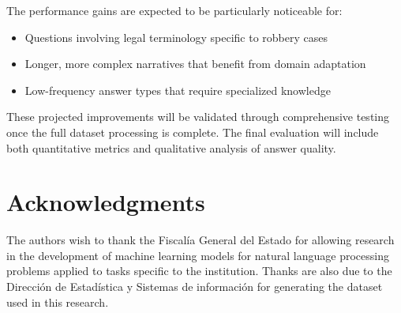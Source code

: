 \documentclass[onecolumn, journal, english, 12pt, a4paper]{IEEEtran} %
\theoremstyle{definition}
\begin{document}
The performance gains are expected to be particularly noticeable for:
\begin{itemize}
\item Questions involving legal terminology specific to robbery cases
\item Longer, more complex narratives that benefit from domain adaptation
\item Low-frequency answer types that require specialized knowledge
\end{itemize}

These projected improvements will be validated through comprehensive
testing once the full dataset processing is complete. The final
evaluation will include both quantitative metrics and qualitative
analysis of answer quality.





\section*{Acknowledgments}

The authors wish to thank the Fiscalía General del Estado for allowing
research in the development of machine learning models for natural
language processing problems applied to tasks specific to the
institution. Thanks are also due to the Dirección de Estadística y
Sistemas de información for generating the dataset used in this
research.

\ifCLASSOPTIONcaptionsoff
  \newpage
\fi





%
%
%
\end{document}
